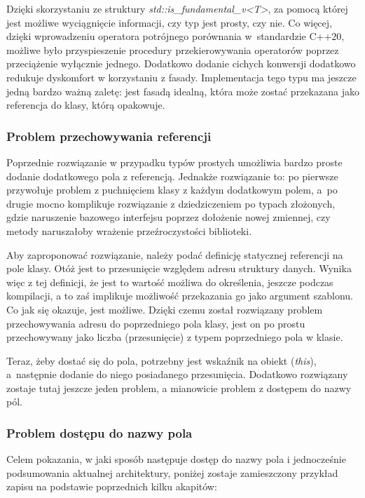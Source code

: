 \documentclass[12pt]{article}
\newcommand{\n}{\newline}
\newcommand{\code}[1]{{\it #1}}
\begin{document}
{{{				Dzięki skorzystaniu ze struktury \code{std::is\_fundamental\_v<T>}\cite{std_is_fundamental}, za pomocą której jest możliwe wyciągnięcie informacji,
				czy typ jest prosty, czy nie. Co więcej, dzięki wprowadzeniu operatora potrójnego porównania \cite{starship_operator} w~standardzie C++20, możliwe było
				przyspieszenie procedury przekierowywania operatorów poprzez przeciążenie wyłącznie jednego. Dodatkowo dodanie cichych konwersji dodatkowo redukuje
				dyskomfort w korzystaniu z fasady. Implementacja tego typu ma jeszcze jedną bardzo ważną zaletę: jest fasadą idealną, która może zostać przekazana jako referencja
				do klasy, którą opakowuje.
			}

			{
				\subsubsection{Problem przechowywania referencji}

				Poprzednie rozwiązanie w przypadku typów prostych umożliwia bardzo proste dodanie dodatkowego pola z referencją. Jednakże rozwiązanie to:
				po pierwsze przywołuje problem z puchnięciem klasy z każdym dodatkowym polem, a~po drugie mocno komplikuje rozwiązanie z dziedziczeniem po
				typach złożonych, gdzie naruszenie bazowego interfejsu poprzez dołożenie nowej zmiennej, czy metody naruszałoby wrażenie przeźroczystości
				biblioteki.\n

				Aby zaproponować rozwiązanie, należy podać definicję statycznej referencji na pole klasy. Otóż jest to przesunięcie względem
				adresu struktury danych. Wynika więc z tej definicji, że jest to wartość możliwa do określenia, jeszcze podczas kompilacji,
				a to zaś implikuje możliwość przekazania go jako argument szablonu. Co jak się okazuje, jest możliwe. Dzięki czemu został rozwiązany problem
				przechowywania adresu do poprzedniego pola klasy, jest on po prostu przechowywany jako liczba (przesunięcie) z typem poprzedniego pola w klasie.\n

				Teraz, żeby dostać się do pola, potrzebny jest wskaźnik na obiekt (\code{this}), a~następnie dodanie do niego posiadanego przesunięcia.
				Dodatkowo rozwiązany zostaje tutaj jeszcze jeden problem, a mianowicie problem z dostępem do nazwy pól.
			}

			{
				\subsubsection{Problem dostępu do nazwy pola}

				Celem pokazania, w jaki sposób następuje dostęp do nazwy pola i jednocześnie podsumowania aktualnej architektury, poniżej zostaje zamieszczony
				przykład zapisu na podstawie poprzednich kilku akapitów:\n

}}}
\end{document}
